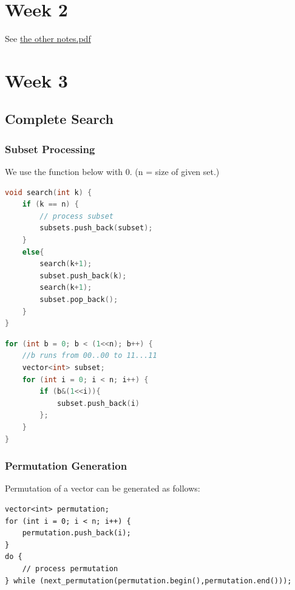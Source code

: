 \documentclass{report}
\begin{document}
\chapter{Week 2}
See \href{C:/CODE/atgit/notes/cp/notes.pdf}{the other notes.pdf}
\chapter{Week 3}
\section{Complete Search}
\subsection*{Subset Processing}
We use the function below with 0. (n = size of given set.)
\begin{lstlisting}[language=C++,caption=Subset Generation]
void search(int k) {
    if (k == n) {
        // process subset
        subsets.push_back(subset);
    }
    else{
        search(k+1);
        subset.push_back(k);
        search(k+1);
        subset.pop_back();
    }
}
\end{lstlisting}
\begin{lstlisting}[language=C++]
for (int b = 0; b < (1<<n); b++) {
    //b runs from 00..00 to 11...11
    vector<int> subset;
    for (int i = 0; i < n; i++) {
        if (b&(1<<i)){
            subset.push_back(i)
        };
    }
}
\end{lstlisting}
\subsection*{Permutation Generation}
Permutation of a vector can be generated as follows:
\begin{lstlisting}
vector<int> permutation;
for (int i = 0; i < n; i++) {
    permutation.push_back(i);
}
do {
    // process permutation
} while (next_permutation(permutation.begin(),permutation.end()));
\end{lstlisting}
\end{document}
